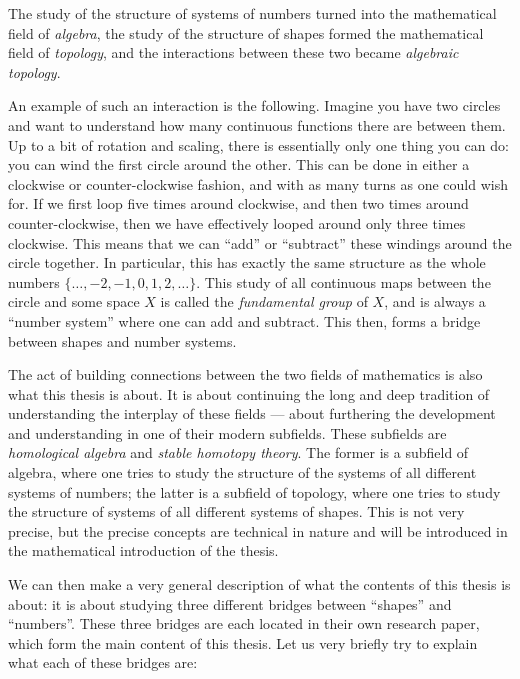 The study of the structure of systems of numbers turned into the mathematical field of \emph{algebra}, the study of the structure of shapes formed the mathematical field of \emph{topology}, and the interactions between these two became \emph{algebraic topology}. 

An example of such an interaction is the following. Imagine you have two circles and want to understand how many continuous functions there are between them. Up to a bit of rotation and scaling, there is essentially only one thing you can do: you can wind the first circle around the other. This can be done in either a clockwise or counter-clockwise fashion, and with as many turns as one could wish for. If we first loop five times around clockwise, and then two times around counter-clockwise, then we have effectively looped around only three times clockwise. This means that we can ``add'' or ``subtract'' these windings around the circle together. In particular, this has exactly the same structure as the whole numbers $\{\ldots,-2, -1, 0, 1, 2,\ldots\}$. This study of all continuous maps between the circle and some space $X$ is called the \emph{fundamental group} of $X$, and is always a ``number system'' where one can add and subtract. This then, forms a bridge between shapes and number systems. 

The act of building connections between the two fields of mathematics is also what this thesis is about. It is about continuing the long and deep tradition of understanding the interplay of these fields --- about furthering the development and understanding in one of their modern subfields. These subfields are \emph{homological algebra} and \emph{stable homotopy theory}. The former is a subfield of algebra, where one tries to study the structure of the systems of all different systems of numbers; the latter is a subfield of topology, where one tries to study the structure of systems of all different systems of shapes. This is not very precise, but the precise concepts are technical in nature and will be introduced in the mathematical introduction of the thesis. 

We can then make a very general description of what the contents of this thesis is about: it is about studying three different bridges between ``shapes'' and ``numbers''. These three bridges are each located in their own research paper, which form the main content of this thesis. Let us very briefly try to explain what each of these bridges are: 

